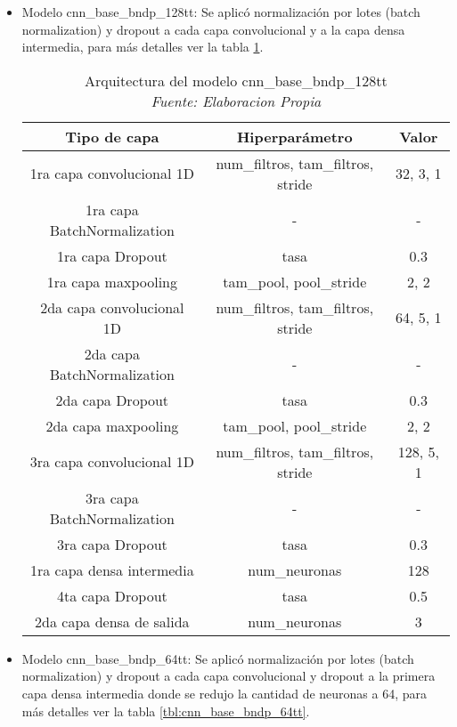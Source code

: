 \begin{itemize}
	
	\item Modelo cnn\_base\_bndp\_128tt: Se aplicó normalización por lotes (batch normalization) y dropout a cada capa convolucional y a la capa densa intermedia, para más detalles ver la tabla \ref{tbl:cnn_base_bndp_128tt}.
	
	\begin{table}[!ht]
		\centering
		\begin{tabular}{|c|c|c|}
			\hline
			\textbf{Tipo de capa} & \textbf{Hiperparámetro} & \textbf{Valor} \\ \hline
			1ra capa convolucional 1D & num\_filtros, tam\_filtros, stride & 32, 3, 1 \\ \hline
			1ra capa BatchNormalization & - & - \\ \hline
			1ra capa Dropout & tasa & 0.3 \\ \hline
			1ra capa maxpooling & tam\_pool, pool\_stride & 2, 2 \\ \hline
			2da capa convolucional 1D & num\_filtros, tam\_filtros, stride & 64, 5, 1 \\ \hline
			2da capa BatchNormalization & - & - \\ \hline
			2da capa Dropout & tasa & 0.3 \\ \hline
			2da capa maxpooling & tam\_pool, pool\_stride & 2, 2 \\ \hline
			3ra capa convolucional 1D & num\_filtros, tam\_filtros, stride & 128, 5, 1 \\ \hline
			3ra capa BatchNormalization & - & - \\ \hline
			3ra capa Dropout & tasa & 0.3 \\ \hline
			1ra capa densa intermedia & num\_neuronas & 128 \\ \hline
			4ta capa Dropout & tasa & 0.5 \\ \hline
			2da capa densa de salida & num\_neuronas & 3 \\ \hline
		\end{tabular}
		\caption{Arquitectura del modelo cnn\_base\_bndp\_128tt
			\\\textit{Fuente: Elaboracion Propia}}
		\label{tbl:cnn_base_bndp_128tt}
	\end{table}
	
	
	\item Modelo cnn\_base\_bndp\_64tt: Se aplicó normalización por lotes (batch normalization) y dropout a cada capa convolucional y dropout a la primera capa densa intermedia donde se redujo la cantidad de neuronas a 64, para más detalles ver la tabla \ref{tbl:cnn_base_bndp_64tt}.
	

\end{itemize}
